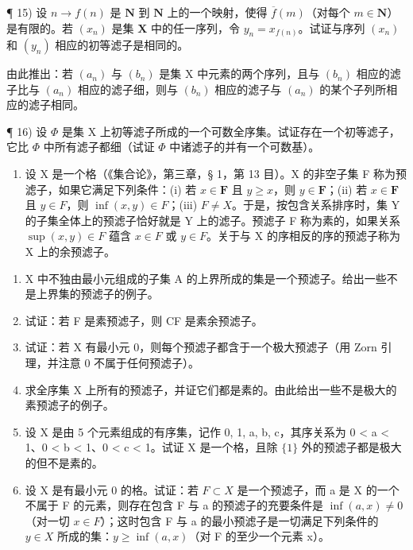 ¶ 15) 设 \(n \to f(n)\) 是 \(\mathbf{N}\) 到 \(\mathbf{N}\) 上的一个映射，使得 \(\overline{f}(m)\)（对每个 \(m \in \mathbf{N}\)）是有限的。若 \((x_n)\) 是集 \(\mathbf{X}\) 中的任一序列，令 \(y_n = x_{f(n)}\)。试证与序列 \((x_n)\) 和 \((y_n)\) 相应的初等滤子是相同的。

由此推出：若 \((a_{n})\) 与 \((b_{n})\) 是集 X 中元素的两个序列，且与 \((b_{n})\) 相应的滤子比与 \((a_{n})\) 相应的滤子细，则与 \((b_{n})\) 相应的滤子与 \((a_{n})\) 的某个子列所相应的滤子相同。

¶ 16) 设 \(\Phi\) 是集 X 上初等滤子所成的一个可数全序集。试证存在一个初等滤子，它比 \(\Phi\) 中所有滤子都细（试证 \(\Phi\) 中诸滤子的并有一个可数基）。

\begin{enumerate}
\def\labelenumi{\arabic{enumi})}
\setcounter{enumi}{16}
\tightlist
\item
  设 X 是一个格（《集合论》，第三章，§ 1，第 13 目）。X 的非空子集 F 称为预滤子，如果它满足下列条件：(i) 若 \(x \in \mathbf{F}\) 且 \(y \geqslant x\)，则 \(y \in \mathbf{F}\)；(ii) 若 \(x \in \mathbf{F}\) 且 \(y \in F\)，则 \(\inf (x, y) \in F\)；(iii) \(F \neq X\)。于是，按包含关系排序时，集 Y 的子集全体上的预滤子恰好就是 Y 上的滤子。预滤子 F 称为素的，如果关系 \(\sup(x, y) \in F\) 蕴含 \(x \in F\) 或 \(y \in F\)。关于与 X 的序相反的序的预滤子称为 X 上的余预滤子。
\end{enumerate}

\begin{enumerate}
\def\labelenumi{\alph{enumi})}
\item
  X 中不独由最小元组成的子集 A 的上界所成的集是一个预滤子。给出一些不是上界集的预滤子的例子。
\item
  试证：若 F 是素预滤子，则 CF 是素余预滤子。
\item
  试证：若 X 有最小元 0，则每个预滤子都含于一个极大预滤子（用 Zorn 引理，并注意 0 不属于任何预滤子）。
\item
  求全序集 X 上所有的预滤子，并证它们都是素的。由此给出一些不是极大的素预滤子的例子。
\item
  设 X 是由 5 个元素组成的有序集，记作 0, 1, a, b, c，其序关系为 0 \textless{} a \textless{} 1、0 \textless{} b \textless{} 1、0 \textless{} c \textless{} 1。试证 X 是一个格，且除 \(\{1\}\) 外的预滤子都是极大的但不是素的。
\item
  设 X 是有最小元 0 的格。试证：若 \(F \subset X\) 是一个预滤子，而 a 是 X 的一个不属于 F 的元素，则存在包含 F 与 a 的预滤子的充要条件是 \(\inf (a, x) \neq 0\)（对一切 \(x \in F\)）；这时包含 F 与 a 的最小预滤子是一切满足下列条件的 \(y \in X\) 所成的集：\(y \geqslant \inf (a, x)\)（对 F 的至少一个元素 x）。
\end{enumerate}


